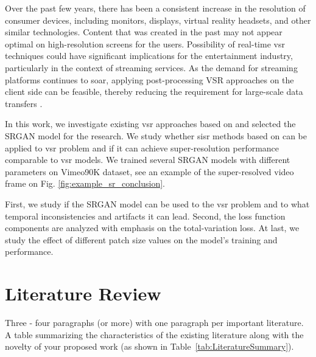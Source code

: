 \documentclass[conference]{IEEEtran}
\begin{document}
Over the past few years, there has been a consistent increase in the resolution of consumer devices, including monitors, displays, virtual reality headsets, and other similar technologies. Content that was created in the past may not appear optimal on high-resolution screens for the users. Possibility of real-time \acrshort{vsr} techniques could have significant implications for the entertainment industry, particularly in the context of streaming services. As the demand for streaming platforms continues to soar, applying post-processing VSR approaches on the client side can be feasible, thereby reducing the requirement for large-scale data transfers \cite{video_super_resolution_survey_2020}.

In this work, we investigate existing \acrshort{vsr} approaches based on  and selected the SRGAN \cite{srgan_2016} model for the research. We study whether \acrlong{sisr} methods based on  can be applied to \acrlong{vsr} problem and if it can achieve super-resolution performance comparable to \acrshort{vsr} models. We trained several SRGAN models with different parameters on Vimeo90K dataset, see an example of the super-resolved video frame on Fig. \ref{fig:example_sr_conclusion}.

First, we study if the SRGAN model can be used to the \acrshort{vsr} problem and to what temporal inconsistencies and artifacts it can lead. Second, the loss function components are analyzed with emphasis on the total-variation loss. At last, we study the effect of different patch size values on the model's training and performance.






\section{Literature Review}
Three - four paragraphs (or more) with one paragraph per important literature.
A table summarizing the characteristics of the existing literature along with the novelty of your proposed work (as shown in Table~\ref{tab:LiteratureSummary}).
\end{document}
